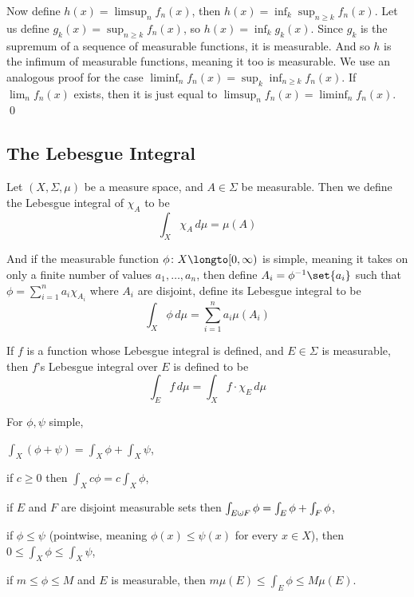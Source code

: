 Now define $h(x)=\limsup_nf_n(x)$, then $h(x)=\inf_k\sup_{n\geq k}f_n(x)$.
Let us define $g_k(x)=\sup_{n\geq k}f_n(x)$, so $h(x)=\inf_kg_k(x)$.
Since $g_k$ is the supremum of a sequence of measurable functions, it is measurable.
And so $h$ is the infimum of measurable functions, meaning it too is measurable.
We use an analogous proof for the case $\liminf_nf_n(x)=\sup_k\inf_{n\geq k}f_n(x)$.
If $\lim_nf_n(x)$ exists, then it is just equal to $\limsup_nf_n(x)=\liminf_nf_n(x)$.
\qed

\subsection{The Lebesgue Integral}

\bdefn

    Let $(X,\Sigma,\mu)$ be a measure space, and $A\in\Sigma$ be measurable.
    Then we define the {\emphcolor Lebesgue integral} of $\chi_A$ to be
    $$ \int_X\chi_A\,d\mu = \mu(A) $$

    And if the measurable function $\phi\colon X\longto[0,\infty)$ is {\emphcolor simple}, meaning it takes on only a finite number of values $a_1,\dots,a_n$, then define $A_i=\phi^{-1}\set{a_i}$ such that
    $\phi=\sum_{i=1}^na_i\chi_{A_i}$ where $A_i$ are disjoint, define its Lebesgue integral to be
    $$ \int_X\phi\,d\mu = \sum_{i=1}^na_i\mu(A_i) $$

    If $f$ is a function whose Lebesgue integral is defined, and $E\in\Sigma$ is measurable, then $f$'s Lebesgue integral over $E$ is defined to be
    $$ \int_Ef\,d\mu = \int_Xf\cdot\chi_E\,d\mu $$
\edefn

\bprop

    For $\phi,\psi$ simple,
    \benum
        \item $\int_X(\phi+\psi)=\int_X\phi+\int_X\psi$,
        \item if $c\geq0$ then $\int_Xc\phi=c\int_X\phi$,
        \item if $E$ and $F$ are disjoint measurable sets then $\int_{E\dcup F}\phi=\int_E\phi+\int_F\phi$,
        \item if $\phi\leq\psi$ (pointwise, meaning $\phi(x)\leq\psi(x)$ for every $x\in X$), then $0\leq\int_X\phi\leq\int_X\psi$,
        \item if $m\leq\phi\leq M$ and $E$ is measurable, then $m\mu(E)\leq\int_E\phi\leq M\mu(E)$.
    \eenum

\eprop

